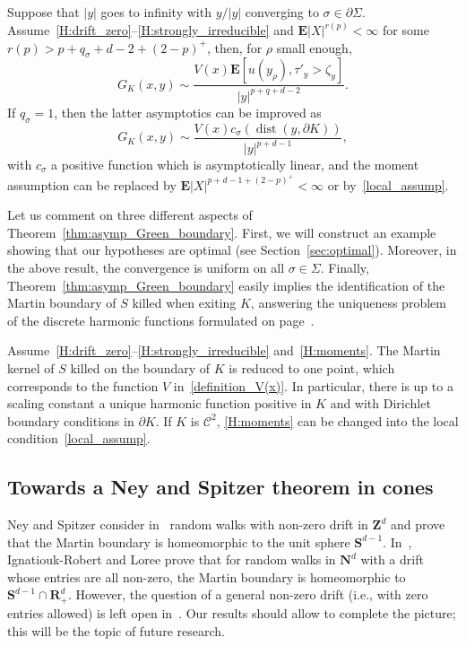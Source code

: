 \documentclass[AHL,Unicode,longabstracts,published]{cedram}
\DeclareMathOperator{\dist}{dist}
\newcommand{\clC}{\mathcal{C}}
\newcommand{\e}{\mathbf{E}}
\newcommand{\bfS}{\mathbf{S}}
\newcommand{\bfR}{\mathbf{R}}
\newcommand{\bfZ}{\mathbf{Z}}
\newcommand{\bfN}{\mathbf{N}}
\begin{document}
\begin{theo}\label{thm:asymp_Green_boundary}
Suppose that $| y|$ goes to infinity with $y/| y|$ converging to $\sigma\in \partial \Sigma$. Assume~\eqref{H:drift_zero}--\eqref{H:strongly_irreducible} and $\e| X|^{r(p)}<\infty$ for some $r(p)>p+q_{\sigma}+d-2+(2-p)^{+}$, then, for $\rho$ small enough,
\[
G_K(x,y)\sim \frac{V(x) \e\left[u(y_{\rho}),\tau'_{y}>\zeta_{y}\right]}{| y|^{p+q+d-2}}.
\]
If $q_{\sigma}=1$, then the latter asymptotics can be improved as
\[
G_K(x,y)\sim \frac{V(x)c_{\sigma}\left(\dist(y,\partial K)\right)}{| y|^{p+d-1}},
\]
with $c_{\sigma}$ a positive function which is asymptotically linear, and the moment assumption can be replaced by $\e| X|^{p+d-1+(2-p)^{+}}<\infty$ or by~\eqref{local_assump}.
\end{theo}

Let us comment on three different aspects of Theorem~\ref{thm:asymp_Green_boundary}. First, we will construct an example showing that our hypotheses are optimal (see Section~\ref{sec:optimal}). Moreover, in the above result, the convergence is uniform on all $\sigma\in \Sigma$. Finally, Theorem~\ref{thm:asymp_Green_boundary} easily implies the identification of the Martin boundary of $S$ killed when exiting ${K}$, answering the uniqueness problem of the discrete harmonic functions formulated on page~\pageref{page:problem}.

\begin{theo}\label{thm:Martin_boundary}
Assume~\eqref{H:drift_zero}--\eqref{H:strongly_irreducible} and~\eqref{H:moments}. The Martin kernel of $S$ killed on the boundary of ${K}$ is reduced to one point, which corresponds to the function $V$ in~\eqref{definition_V(x)}. In particular, there is up to a scaling constant a unique harmonic function positive in $K$ and with Dirichlet boundary conditions in $\partial K$. If $K$ is $\clC^{2}$, \eqref{H:moments} can be changed into the local condition~\eqref{local_assump}.
\end{theo}



\subsection*{Towards a Ney and Spitzer theorem in cones}

Ney and Spitzer consider in~\cite{NeSp-66} random walks with non-zero drift in $\bfZ^d$ and prove that the Martin boundary is homeomorphic to the unit sphere $\bfS^{d-1}$. In~\cite{IRLo-10,IR-09}, Ignatiouk-Robert and Loree prove that for random walks in $\bfN^d$ with a drift whose entries are all non-zero, the Martin boundary is homeomorphic to $\bfS^{d-1}\cap \bfR_+^d$. However, the question of a general non-zero drift (i.e., with zero entries allowed) is left open in~\cite{IRLo-10,IR-09}. Our results should allow to complete the picture; this will be the topic of future research.
\end{document}
